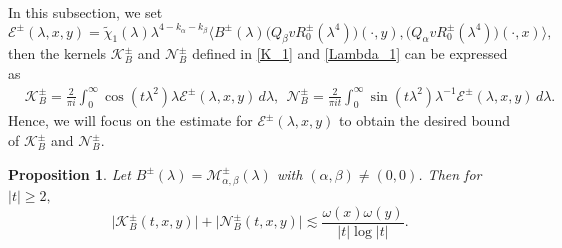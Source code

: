\documentclass[reqno]{amsart}
\newtheorem{proposition}[theorem]{Proposition}
\numberwithin{equation}{section}
\begin{document}
In this subsection, we set
\begin{equation}\label{eq:def_mathcal_E}
	\mathcal{E}^\pm(\lambda,x,y)
	= \widetilde{\chi}_1(\lambda) \lambda^{4-k_\alpha-k_\beta}
	\bigl\langle B^\pm(\lambda) \bigl( Q_\beta v R_0^{\pm}(\lambda^4) \bigr)(\cdot,y),
	\bigl( Q_\alpha v R_0^{\pm} (\lambda^4)\bigr)(\cdot,x) \bigr\rangle,
\end{equation}
then  the kernels  $\mathcal{K}_{B}^\pm$ and $\mathcal{N}_{B}^\pm$ defined in \eqref{K_1} and \eqref{Lambda_1} can be expressed as
\begin{align}
	\label{K-N-weig}
	& \mathcal{K}_{B}^\pm=\frac{2}{\pi i}\int_0^{\infty} \cos(t \lambda^2)\lambda  \mathcal{E}^\pm(\lambda,x,y)\, d \lambda, \  \ \mathcal{N}_{B}^\pm=\frac{2}{\pi i t}\int_0^{\infty} \sin(t\lambda^2)\lambda^{-1} \mathcal{E}^\pm(\lambda,x,y) \, d \lambda. \end{align}
Hence, we will focus on the estimate for  $\mathcal{E}^\pm(\lambda,x,y)$ to obtain the desired bound of $\mathcal{K}_{B}^\pm$ and $\mathcal{N}_{B}^\pm$.
\begin{proposition}\label{prop_K_weight_1}
	Let $B^\pm(\lambda)=\mathcal{M}_{\alpha,\beta}^\pm(\lambda)$ with $(\alpha,\beta) \neq (0,0)$. Then for $|t| \ge 2,$
	\[
	\bigl|\mathcal{K}_{B}^\pm(t,x,y)\bigr| +
	\bigl|\mathcal{N}_{B}^\pm(t,x,y)\bigr| \lesssim \frac{\omega(x)\omega(y)}{|t| \log|t|}.
	\]
\end{proposition}
\end{document}

